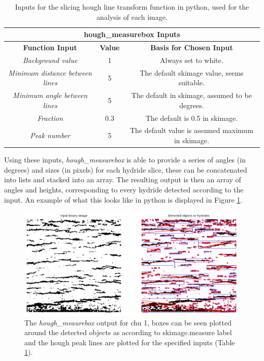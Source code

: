\documentclass{article}
\begin{document}
    \begin{table}[h]
	    \begin{center}
	    \begin{tabular}{ |c|c|c| } 
		    \hline
		    \multicolumn{3}{|c|}{\textbf{hough\_measurebox Inputs}} \\
		    \hline
		    \textbf{Function Input} & \textbf{Value} & \textbf{Basis for Chosen Input} \\
		    \hline
		    \textit{Background value} & 1 & Always set to white. \\
		    \hline
		    \textit{Minimum distance between lines} & 5 & The default skimage value, seems suitable. \\ 
		    \hline
		    \textit{Minimum angle between lines} & 5 & The default in skimage, assumed to be degrees. \\
		    \hline
		    \textit{Fraction} & 0.3 & The default is 0.5 in skimage. \\ 
		    \hline
		    \textit{Peak number} & 5 & The default value is assumed maximum in skimage. \\ 
		    \hline
	    \end{tabular}
	    \caption{Inputs for the slicing hough line transform function in python, used for the analysis of each image.}
	    \label{HoughmeasureboxInputs}
	    \end{center}
    \end{table}
    
    \noindent Using these inputs, \textit{hough\_measurebox} is able to provide a series of angles (in degrees) and sizes (in pixels) for each hydride slice, these can be concatenated into lists and stacked into an array. The resulting output is then an array of angles and heights, corresponding to every hydride detected according to the input. An example of what this looks like in python is displayed in Figure \ref{fig:houghmeasure_chu1}.
    
    \begin{figure}[h]
        \centering
        \includegraphics[scale=0.5]{Figures/houghmeasure_chu1.PNG}
        \caption{The \textit{hough\_meaurebox} output for chu 1, boxes can be seen plotted around the detected objects as according to skimage.measure label and the hough peak lines are plotted for the specified inputs (Table \ref{HoughmeasureboxInputs}).}
        \label{fig:houghmeasure_chu1}
    \end{figure}
    
\end{document}
